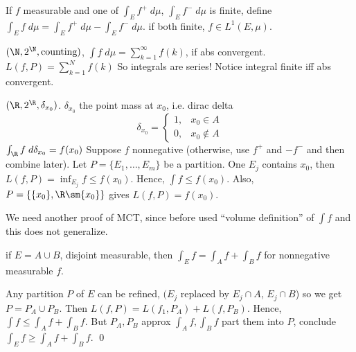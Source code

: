 \begin{dfn}
If $f$ measurable and one of $\int_E f^+ \; d\mu$, $\int_E f^- \; d\mu$ is finite, define $\int_E f \; d\mu= \int_E f^+ \; d\mu - \int_E f^- \; d\mu$. if both finite, $f \in L^1(E,\mu)$. 
\end{dfn}


\begin{ex}
$(\N,2^\N,\text{counting})$, $\int f \;d\mu= \sum_{k=1}^\infty f(k)$, if abs convergent. $L(f,P)= \sum_{k=1}^N f(k)$ So integrals are series! Notice integral finite iff abs convergent. 
\end{ex}


\begin{ex}
$(\R, 2^\R, \delta_{x_0})$. $\delta_{x_0}$ the point mass at $x_0$, i.e. dirac delta 
	\[
	\delta_{x_0}= 
	\begin{cases}
	1, & x_0 \in A \\
	0, & x_0 \notin A
	\end{cases}
	\]
$\int_\R f \; d\delta_{x_0}= f(x_0)$ \pf Suppose $f$ nonnegative (otherwise, use $f^+$ and $-f^-$ and then combine later). Let $P=\{E_1,\ldots,E_m\}$ be a partition. One $E_j$ contains $x_0$, then $L(f,P)= \inf_{E_j} f \leq f(x_0)$. Hence, $\int f \leq f(x_0)$. Also, $P = \{ \{x_0\}, \R \sm \{x_0\} \}$ gives $L(f,P)= f(x_0)$. 
\end{ex}


We need another proof of MCT, since before used ``volume definition'' of $\int f$ and this does not generalize. 


\begin{lem}
if $E= A \cup B$, disjoint measurable, then $\int_E f= \int_A f + \int_B f$ for nonnegative measurable $f$. 
\end{lem}

\pf Any partition $P$ of $E$ can be refined, $(E_j$ replaced by $E_j \cap A$, $E_j \cap B$) so we get $P= P_A \cup P_B$. Then $L(f,P)= L(f_1,P_A) + L(f,P_B)$. Hence, $\int f \leq \int_A f + \int_B f$. But $P_A,P_B$ approx $\int_A f, \int_B f$ part them into $P$, conclude $\int_E f \geq \int_A f + \int_B f$. \qed \\















